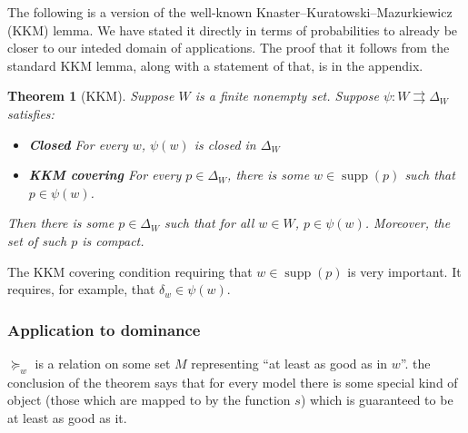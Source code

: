 \documentclass[11pt]{article}
\newtheorem{theorem}{Theorem}[section]
\theoremstyle{definition}
\newtheorem{definition}[theorem]{Definition}
\theoremstyle{remark}
\newcommand{\supp}{\operatorname{supp}}
\begin{document}
The following is a version of the well-known Knaster–Kuratowski–Mazurkiewicz (KKM) lemma. We have stated it directly in terms of probabilities to already be closer to our inteded domain of applications. The proof that it follows from the standard KKM lemma, along with a statement of that, is in the appendix. 

\begin{theorem}[KKM]
	Suppose $W$ is a finite nonempty set.
	Suppose $\psi:W\rightrightarrows \Delta_W$ satisfies:\begin{itemize}
	\item \textbf{Closed} For every $w$, $\psi(w)$ is closed in $\Delta_W$
	\item \textbf{KKM covering} For every $p\in \Delta_W$, there is some $w\in\supp(p)$ such that $p\in\psi(w)$.
\end{itemize}
Then there is some $p\in \Delta_W$ such that for all $w\in W$, $p\in\psi(w)$. Moreover, the set of such $p$ is compact.
\end{theorem}

The KKM covering condition requiring that $w\in\supp(p)$ is very important. It requires, for example, that $\delta_w\in \psi(w)$.

\subsubsection{Application to dominance}

$\succeq_w$ is a relation on some set $M$ representing  ``at least as good as in $w$''.
the conclusion of the theorem says that for every model there is some special kind of object (those which are mapped to by the function $s$) which is guaranteed to be at least as good as it. 

\end{document}
